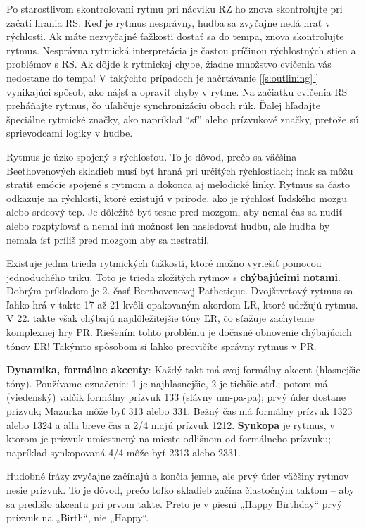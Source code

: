 \documentclass[11pt,a4paper]{book}
\newcommand*{\fullref}[1]{\hyperref[{#1}]{\ref*{#1} \nameref*{#1}}} %
\newcommand*{\fullrefp}[1]{[\fullref{#1}]} %
\begin{document}
Po starostlivom skontrolovaní rytmu pri nácviku RZ ho znova skontrolujte pri začatí hrania RS. Keď je rytmus nesprávny, hudba sa zvyčajne nedá hrať v rýchlosti. Ak máte nezvyčajné ťažkosti dostať sa do tempa, znova skontrolujte rytmus. Nesprávna rytmická interpretácia je častou príčinou rýchlostných stien a problémov s RS. Ak dôjde k rytmickej chybe, žiadne množstvo cvičenia vás nedostane do tempa! V takýchto prípadoch je načrtávanie \fullrefp{s:outlining} vynikajúci spôsob, ako nájsť a opraviť chyby v rytme. Na začiatku cvičenia RS preháňajte rytmus, čo uľahčuje synchronizáciu oboch rúk. Ďalej hľadajte špeciálne rytmické značky, ako napríklad “sf” alebo prízvukové značky, pretože sú sprievodcami logiky v hudbe.

Rytmus je úzko spojený s rýchlosťou. To je dôvod, prečo sa väčšina Beethovenových skladieb musí byť hraná pri určitých rýchlostiach; inak sa môžu stratiť emócie spojené s rytmom a dokonca aj melodické linky. Rytmus sa často odkazuje na rýchlosti, ktoré existujú v prírode, ako je rýchlosť ľudského mozgu alebo srdcový tep. Je dôležité byť tesne pred mozgom, aby nemal čas sa nudiť alebo rozptyľovať a nemal inú možnosť len nasledovať hudbu, ale hudba by nemala ísť príliš pred mozgom aby sa nestratil.

Existuje jedna trieda rytmických ťažkostí, ktoré možno vyriešiť pomocou jednoduchého triku. Toto je trieda zložitých rytmov s \textbf{chýbajúcimi notami}. Dobrým príkladom je 2. časť Beethovenovej Pathetique. Dvojštvrťový rytmus sa ľahko hrá v takte 17 až 21 kvôli opakovaným akordom ĽR, ktoré udržujú rytmus. V 22. takte však chýbajú najdôležitejšie tóny ĽR, čo sťažuje zachytenie komplexnej hry PR. Riešením tohto problému je dočasné obnovenie chýbajúcich tónov ĽR! Takýmto spôsobom si ľahko precvičíte správny rytmus v PR.

\textbf{Dynamika, formálne akcenty}: Každý takt má svoj formálny akcent (hlasnejšie tóny). Používame označenie: 1 je najhlasnejšie, 2 je tichšie atď.; potom má (viedenský) valčík formálny prízvuk 133 (slávny um-pa-pa); prvý úder dostane prízvuk; Mazurka môže byť 313 alebo 331. Bežný čas má formálny prízvuk 1323 alebo 1324 a alla breve čas a 2/4 majú prízvuk 1212. \textbf{Synkopa} je rytmus, v ktorom je prízvuk umiestnený na mieste odlišnom od formálneho prízvuku; napríklad synkopovaná 4/4 môže byť 2313 alebo 2331.

Hudobné frázy zvyčajne začínajú a končia jemne, ale prvý úder väčšiny rytmov nesie prízvuk. To je dôvod, prečo toľko skladieb začína čiastočným taktom – aby sa predišlo akcentu pri prvom takte. Preto je v piesni „Happy Birthday“ prvý prízvuk na „Birth“, nie „Happy“.
\end{document}
